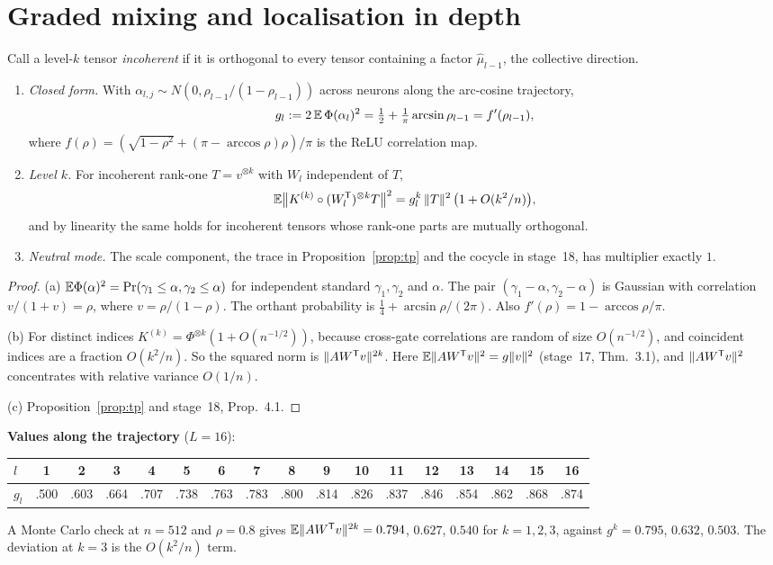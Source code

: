 \section{Graded mixing and localisation in depth}\label{sec:graded}
Call a level-$k$ tensor \emph{incoherent} if it is orthogonal to every tensor containing a factor
$\hat\mu_{l-1}$, the collective direction.

\begin{theorem}\label{thm:graded}
\begin{enumerate}[label=(\alph*),leftmargin=1.6em,itemsep=1pt,topsep=1pt]
\item \emph{Closed form.} With $\alpha_{l,j}\sim N(0,\rho_{l-1}/(1-\rho_{l-1}))$ across neurons along the arc-cosine
trajectory,
\[
g_l:=2\,\mathbb{E}\,\Phi(\alpha_l)^2=\tfrac12+\tfrac1\pi\arcsin\rho_{l-1}=f'(\rho_{l-1}),
\]
where $f(\rho)=(\sqrt{1-\rho^2}+(\pi-\arccos\rho)\rho)/\pi$ is the ReLU correlation map.
\item \emph{Level $k$.} For incoherent rank-one $T=v^{\otimes k}$ with $W_l$ independent of $T$,
\[
\mathbb{E}\big\|K^{(k)}\circ(W_l^{\mathsf T})^{\otimes k}T\big\|^2=g_l^k\,\|T\|^2\,\big(1+O(k^2/n)\big),
\]
and by linearity the same holds for incoherent tensors whose rank-one parts are mutually orthogonal.
\item \emph{Neutral mode.} The scale component, the trace in Proposition~\ref{prop:tp} and the cocycle in
stage~18, has multiplier exactly $1$.
\end{enumerate}
\end{theorem}
\begin{proof}
(a) $\mathbb{E}\Phi(\alpha)^2=\Pr(\gamma_1\le\alpha,\gamma_2\le\alpha)$ for independent standard $\gamma_1,\gamma_2$ and $\alpha$. The pair
$(\gamma_1-\alpha,\gamma_2-\alpha)$ is Gaussian with correlation $v/(1+v)=\rho$, where $v=\rho/(1-\rho)$. The orthant probability is
$\tfrac14+\arcsin\rho/(2\pi)$. Also $f'(\rho)=1-\arccos\rho/\pi$.

(b) For distinct indices $K^{(k)}=\Phi^{\otimes k}(1+O(n^{-1/2}))$, because cross-gate correlations are random of size
$O(n^{-1/2})$, and coincident indices are a fraction $O(k^2/n)$. So the squared norm is
$\|AW^{\mathsf T} v\|^{2k}$. Here $\mathbb{E}\|AW^{\mathsf T} v\|^2=g\|v\|^2$ (stage~17, Thm.~3.1), and $\|AW^{\mathsf T} v\|^2$ concentrates with relative variance
$O(1/n)$.

(c) Proposition~\ref{prop:tp} and stage~18, Prop.~4.1.
\end{proof}

\noindent\textbf{Values along the trajectory} ($L=16$):
\begin{center}\small
\begin{tabular}{@{}lcccccccccccccccc@{}}\toprule
$l$ & 1&2&3&4&5&6&7&8&9&10&11&12&13&14&15&16\\\midrule
$g_l$ & .500&.603&.664&.707&.738&.763&.783&.800&.814&.826&.837&.846&.854&.862&.868&.874\\\bottomrule
\end{tabular}
\end{center}
A Monte Carlo check at $n=512$ and $\rho=0.8$ gives $\mathbb{E}\|AW^{\mathsf T} v\|^{2k}=0.794$, $0.627$, $0.540$ for
$k=1,2,3$, against $g^k=0.795$, $0.632$, $0.503$. The deviation at $k=3$ is the $O(k^2/n)$ term.

